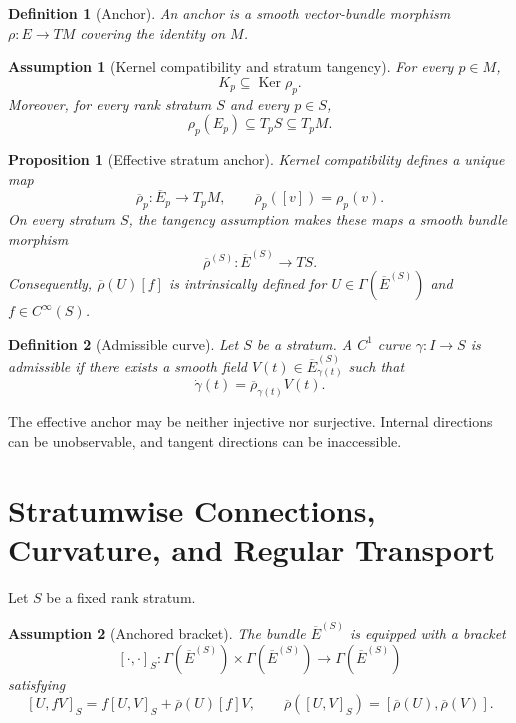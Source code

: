 \documentclass[11pt]{article}
\newtheorem{definition}{Definition}[section]
\newtheorem{assumption}{Assumption}[section]
\newtheorem{proposition}{Proposition}[section]
\newcommand{\Ker}{\operatorname{Ker}}
\begin{document}
\begin{definition}[Anchor]
An anchor is a smooth vector-bundle morphism $\rho:E\to TM$ covering the
identity on $M$.
\end{definition}

\begin{assumption}[Kernel compatibility and stratum tangency]
For every $p\in M$,
\[
K_p\subseteq\Ker\rho_p.
\]
Moreover, for every rank stratum $S$ and every $p\in S$,
\[
\rho_p(E_p)\subseteq T_pS\subseteq T_pM.
\]
\end{assumption}

\begin{proposition}[Effective stratum anchor]
Kernel compatibility defines a unique map
\[
\overline\rho_p:\overline E_p\to T_pM,
\qquad \overline\rho_p([v])=\rho_p(v).
\]
On every stratum $S$, the tangency assumption makes these maps a smooth
bundle morphism
\[
\overline\rho^{(S)}:\overline E^{(S)}\to TS.
\]
Consequently, $\overline\rho(U)[f]$ is intrinsically defined for
$U\in\Gamma(\overline E^{(S)})$ and $f\in C^\infty(S)$.
\end{proposition}

\begin{definition}[Admissible curve]
Let $S$ be a stratum. A $C^1$ curve $\gamma:I\to S$ is admissible if there
exists a smooth field $V(t)\in\overline E^{(S)}_{\gamma(t)}$ such that
\[
\dot\gamma(t)=\overline\rho_{\gamma(t)}V(t).
\]
\end{definition}

The effective anchor may be neither injective nor surjective. Internal
directions can be unobservable, and tangent directions can be inaccessible.

\section{Stratumwise Connections, Curvature, and Regular Transport}
\label{sec:connection}

Let $S$ be a fixed rank stratum.

\begin{assumption}[Anchored bracket]
The bundle $\overline E^{(S)}$ is equipped with a bracket
\[
[\cdot,\cdot]_S:\Gamma(\overline E^{(S)})\times
\Gamma(\overline E^{(S)})\to\Gamma(\overline E^{(S)})
\]
satisfying
\[
[U,fV]_S=f[U,V]_S+\overline\rho(U)[f]V,
\qquad
\overline\rho([U,V]_S)=[\overline\rho(U),\overline\rho(V)].
\]
\end{assumption}
\end{document}
